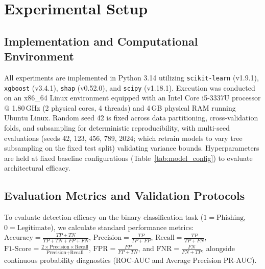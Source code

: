 \section{Experimental Setup}
\label{sec:experiments}

\subsection{Implementation and Computational Environment}
All experiments are implemented in Python 3.14 utilizing \texttt{scikit-learn} (v1.9.1), \texttt{xgboost} (v3.4.1), \texttt{shap} (v0.52.0), and \texttt{scipy} (v1.18.1). Execution was conducted on an x86\_64 Linux environment equipped with an Intel Core i5-3337U processor @ 1.80\,GHz (2 physical cores, 4 threads) and 4\,GB physical RAM running Ubuntu Linux. Random seed 42 is fixed across data partitioning, cross-validation folds, and subsampling for deterministic reproducibility, with multi-seed evaluations (seeds 42, 123, 456, 789, 2024; which retrain models to vary tree subsampling on the fixed test split) validating variance bounds. Hyperparameters are held at fixed baseline configurations (Table~\ref{tab:model_config}) to evaluate architectural efficacy.

\subsection{Evaluation Metrics and Validation Protocols}
To evaluate detection efficacy on the binary classification task ($1 = \text{Phishing}$, $0 = \text{Legitimate}$), we calculate standard performance metrics: $\text{Accuracy} = \frac{TP + TN}{TP + TN + FP + FN}$, $\text{Precision} = \frac{TP}{TP + FP}$, $\text{Recall} = \frac{TP}{TP + FN}$, $\text{F1-Score} = \frac{2 \times \text{Precision} \times \text{Recall}}{\text{Precision} + \text{Recall}}$, $\text{FPR} = \frac{FP}{FP + TN}$, and $\text{FNR} = \frac{FN}{FN + TP}$, alongside continuous probability diagnostics (ROC-AUC and Average Precision PR-AUC).


